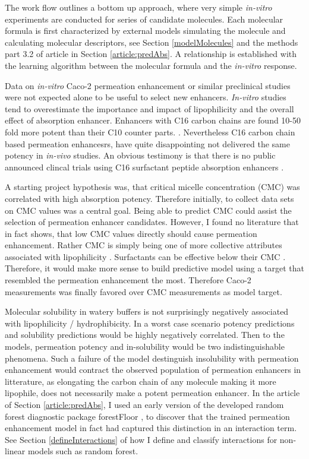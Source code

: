 The work flow outlines a bottom up approach, where very simple \textit{in-vitro} experiments are conducted for series of candidate molecules. Each molecular formula is first characterized by external models simulating the molecule and calculating molecular descriptors, see Section \ref{modelMolecules} and the methods part 3.2 of article in Section \ref{article:predAbs}. A relationship is established with the learning algorithm between the molecular formula and the \textit{in-vitro} response.

Data on \textit{in-vitro} Caco-2 permeation enhancement or similar preclinical studies were not expected alone to be useful to select new enhancers. \textit{In-vitro} studies tend to overestimate the importance and impact of lipophilicity and the overall effect of absorption enhancer. Enhancers with C16 carbon chains are found 10-50 fold more potent than their C10 counter parts. \cite{maher2009safety,tippin2008biorelevant}. Nevertheless C16 carbon chain based permeation enhancesrs, have quite disappointing not delivered the same potency in \textit{in-vivo} studies. An obvious testimony is that there is no public announced clincal trials using C16 surfactant peptide absorption enhancers \cite{aguirre2016current}.

A starting project hypothesis was, that critical micelle concentration (CMC) was correlated with high absorption potency. Therefore initially, to collect data sets on CMC values was a central goal. Being able to predict CMC could assist the selection of permeation enhancer candidates. However, I found no literature that in fact shows, that low CMC values directly should cause permeation enhancement. Rather CMC is simply being one of more collective attributes associated with lipophilicity \cite{rosen2012surfactants}. Surfactants can be effective below their CMC \cite{xia2000mechanistic}. Therefore, it would make more sense to build predictive model using a target that resembled the permeation enhancement the most. Therefore Caco-2 measurements was finally favored over CMC measurements as model target.

Molecular solubility in watery buffers is not surprisingly negatively associated with lipophilicity / hydrophibicity. In a worst case scenario potency predictions and solubility predictions would be highly negatively correlated. Then to the models, permeation potency and in-solubility would be two indistinguishable phenomena. Such a failure of the model destinguish insolubility with permeation enhancement would contract the observed population of permeation enhancers in litterature, as elongating the carbon chain of any molecule making it more lipophile, does not necessarily make a potent permeation enhancer. In the article of Section \ref{article:predAbs}, I used an early version of the developed random forest diagnostic package forestFloor \cite{welling2016forest}, to discover that the trained permeation enhancement model in fact had captured this distinction in an interaction term. See Section \ref{defineInteractions} of how I define and classify interactions for non-linear models such as random forest.

